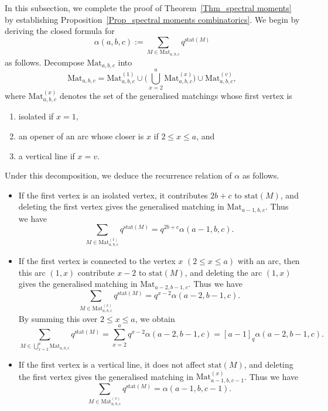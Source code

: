 \documentclass{amsart}
\theoremstyle{plain}
\theoremstyle{remark}
\numberwithin{equation}{section}
\begin{document}
In this subsection, we complete the proof of Theorem~\ref{Thm_spectral moments} by establishing Proposition~\ref{Prop_spectral moments combinatorics}. We begin by deriving the closed formula for
\begin{equation}
    \alpha(a,b,c):=\sum_{M{\in}{\mathrm{Mat}}_{a,b,c}}q^{\mathrm{stat}(M)}
\end{equation}
as follows. Decompose ${\mathrm{Mat}}_{a,b,c}$ into
\begin{equation*}
    {\mathrm{Mat}}_{a,b,c}
    ={\mathrm{Mat}}^{(1)}_{a,b,c}
    \cup\Big(\bigcup_{x=2}^{a}{\mathrm{Mat}}^{(x)}_{a,b,c}\Big)
    \cup{\mathrm{Mat}}^{(v)}_{a,b,c} , 
\end{equation*}
where ${\mathrm{Mat}}^{(x)}_{a,b,c}$ denotes the set of the generalised matchings whose first vertex is 
\begin{enumerate}
    \item isolated if $x=1$,
    \smallskip 
    \item an opener of an arc whose closer is $x$ if $2\leq x\leq a$, and   \smallskip 
    \item a vertical line if $x=v$.
\end{enumerate}
Under this decomposition, we deduce the recurrence relation of $\alpha$ as follows.
\begin{itemize}
    \item If the first vertex is an isolated vertex, it contributes $2b+c$ to $\mathrm{stat}(M)$, and deleting the first vertex gives the generalised matching in ${\mathrm{Mat}}_{a-1,b,c}$. Thus we have
    \begin{equation*}
        \sum_{M\in{\mathrm{Mat}}^{(1)}_{a,b,c}}q^{\mathrm{stat}(M)}=q^{2b+c}\alpha(a-1,b,c). 
    \end{equation*}
    \item If the first vertex is connected to the vertex $x$ $(2\leq x\leq a)$ with an arc, then this arc $(1,x)$ contribute $x-2$ to $\mathrm{stat}(M)$, and deleting the arc $(1,x)$ gives the generalised matching in ${\mathrm{Mat}}_{a-2,b-1,c}$. Thus we have
    \begin{equation*}
        \sum_{M\in{\mathrm{Mat}}^{(x)}_{a,b,c}}q^{\mathrm{stat}(M)}=q^{x-2}\alpha(a-2,b-1,c).
    \end{equation*}
    By summing this over $2\le x\le a$, we obtain 
    \begin{equation*}
        \sum_{M\in\bigcup_{x=2}^{a}{\mathrm{Mat}}_{a,b,c}}q^{\mathrm{stat}(M)}
        =\sum_{x=2}^{a}q^{x-2}\alpha(a-2,b-1,c)
        =[a-1]_{q}\alpha(a-2,b-1,c).
    \end{equation*}
    \item If the first vertex is a vertical line, it does not affect $\mathrm{stat}(M)$, and deleting the first vertex gives the generalised matching in ${\mathrm{Mat}}^{(x)}_{a-1,b,c-1}$. Thus we have
    \begin{equation*}
        \sum_{M\in{\mathrm{Mat}}^{(v)}_{a,b,c}}q^{\mathrm{stat}(M)}=\alpha(a-1,b,c-1).
    \end{equation*}
\end{itemize}
\end{document}
